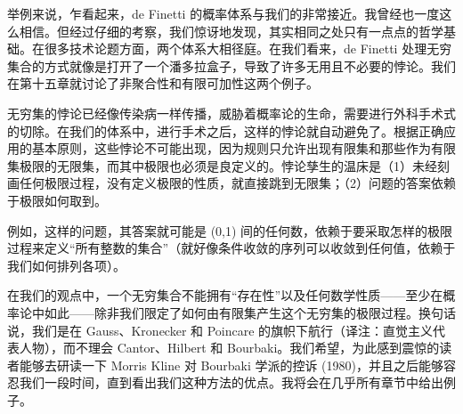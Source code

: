 举例来说，乍看起来，de Finetti 的概率体系与我们的非常接近。我曾经也一度这么相信。但经过仔细的考察，我们惊讶地发现，其实相同之处只有一点点的哲学基础。在很多技术论题方面，两个体系大相径庭。在我们看来，de Finetti 处理无穷集合的方式就像是打开了一个潘多拉盒子，导致了许多无用且不必要的悖论。我们在第十五章就讨论了非聚合性和有限可加性这两个例子。

无穷集的悖论已经像传染病一样传播，威胁着概率论的生命，需要进行外科手术式的切除。在我们的体系中，进行手术之后，这样的悖论就自动避免了。根据正确应用的基本原则，这些悖论不可能出现，因为规则只允许出现有限集和那些作为有限集极限的无限集，而其中极限也必须是良定义的。悖论孳生的温床是（1）未经刻画任何极限过程，没有定义极限的性质，就直接跳到无限集；（2）问题的答案依赖于极限如何取到。

例如，这样的问题，其答案就可能是 (0,1) 间的任何数，依赖于要采取怎样的极限过程来定义“所有整数的集合”（就好像条件收敛的序列可以收敛到任何值，依赖于我们如何排列各项）。

在我们的观点中，一个无穷集合不能拥有“存在性”以及任何数学性质——至少在概率论中如此——除非我们限定了如何由有限集产生这个无穷集的极限过程。换句话说，我们是在 Gauss、Kronecker 和 Poincare 的旗帜下航行（译注：直觉主义代表人物），而不理会 Cantor、Hilbert 和 Bourbaki。我们希望，为此感到震惊的读者能够去研读一下 Morris Kline 对 Bourbaki 学派的控诉 (1980)，并且之后能够容忍我们一段时间，直到看出我们这种方法的优点。我将会在几乎所有章节中给出例子。